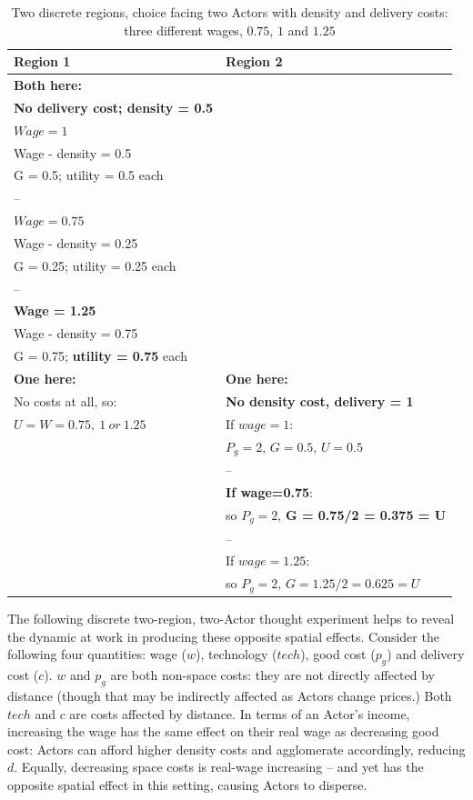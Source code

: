 \renewcommand{\arraystretch}{1.2}
\begin{table}[!hbt]
\begin{center}

\begin{tabular}{|l|l|}
\hline 
\textbf{\large{Region 1}} & \textbf{\large{Region 2}}\\
\hline
\textbf{Both here:} &\\
\textbf{No delivery cost; density = 0.5} & \\
$Wage = 1$ & \\
Wage - density = 0.5 & \\
G = 0.5; utility = 0.5 each & \\
-- & \\
$Wage = 0.75$ & \\
Wage - density = 0.25 & \\
G = 0.25; utility = 0.25 each & \\
-- & \\
\textbf{Wage = 1.25} & \\
Wage - density = 0.75 & \\
G = 0.75; \textbf{utility = 0.75} each & \\
\hline
\textbf{One here:} & \textbf{One here:}\\
No costs at all, so: & \textbf{No density cost, delivery = 1}\\
$U = W = 0.75,\ 1\ or\ 1.25$ & If $wage=1$:\\
& $P_g=2$, $G = 0.5$, $U = 0.5$\\
& --\\
& \textbf{If wage=0.75}: \\
& so $P_g=2$, \textbf{G = 0.75/2 = 0.375 = U}\\
& --\\
& If $wage=1.25$: \\
& so $P_g=2$, $G = 1.25/2 = 0.625 = U$\\
\hline
\end{tabular}

\caption{Two discrete regions, choice facing two Actors with density and delivery costs: three different wages, $0.75$, $1$ and $1.25$\label{tab:discretechoicetable2}}
\end{center}
\end{table}


The following discrete two-region, two-Actor thought experiment helps to reveal the dynamic at work in producing these opposite spatial effects. Consider the following four quantities: wage ($w$), technology ($tech$), good cost ($p_g$) and delivery cost ($c$). $w$ and $p_g$ are both non-space costs: they are not directly affected by distance (though that may be indirectly affected as Actors change prices.) Both $tech$ and $c$ are costs affected by distance. In terms of an Actor’s income, increasing the wage has the same effect on their real wage as decreasing good cost: Actors can afford higher density costs and agglomerate accordingly, reducing $d$. Equally, decreasing space costs is real-wage increasing – and yet has the opposite spatial effect in this setting, causing Actors to disperse.

